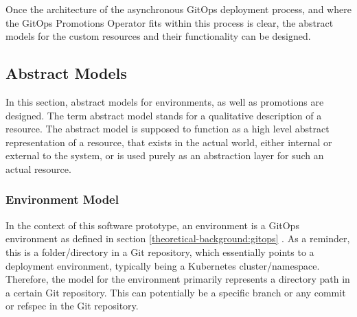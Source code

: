 %
%
%

Once the architecture of the asynchronous GitOps deployment process,
and where the GitOps Promotions Operator fits within this process is clear,
the abstract models for the custom resources and their functionality can be designed.






\subsection{Abstract Models}
\label{prototype:design:abstract-models}

In this section,
abstract models for environments, as well as promotions are designed.
The term abstract model stands for a qualitative description of a resource.
The abstract model is supposed to function as a high level abstract representation of a resource,
that exists in the actual world, either internal or external to the system,
or is used purely as an abstraction layer for such an actual resource.

\subsubsection*{Environment Model}

In the context of this software prototype,
an environment is a GitOps environment as defined in section
\ref{theoretical-background:gitops} .
As a reminder, this is a folder/directory in a Git repository,
which essentially points to a deployment environment, typically being a Kubernetes cluster/namespace.
Therefore, the model for the environment primarily represents a directory path in a certain Git repository.
This can potentially be a specific branch or any commit or refspec in the Git repository.

